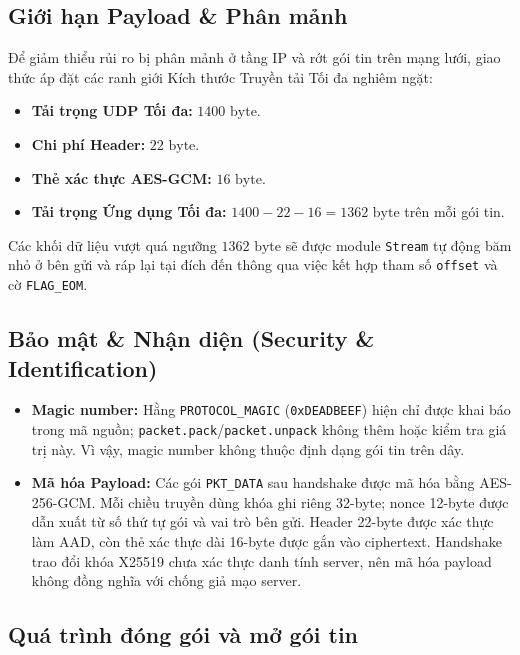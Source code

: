 \subsection{Giới hạn Payload \& Phân mảnh}
Để giảm thiểu rủi ro bị phân mảnh ở tầng IP và rớt gói tin trên mạng lưới, giao thức áp đặt các ranh giới Kích thước Truyền tải Tối đa nghiêm ngặt:

\begin{itemize}
    \item \textbf{Tải trọng UDP Tối đa:} $1400 \text{ byte}$.
    \item \textbf{Chi phí Header:} $22 \text{ byte}$.
    \item \textbf{Thẻ xác thực AES-GCM:} $16 \text{ byte}$.
    \item \textbf{Tải trọng Ứng dụng Tối đa:} $1400-22-16=1362 \text{ byte}$ trên mỗi gói tin.
\end{itemize}
Các khối dữ liệu vượt quá ngưỡng $1362 \text{ byte}$ sẽ được module \texttt{Stream} tự động băm nhỏ ở bên gửi và ráp lại tại đích đến thông qua việc kết hợp tham số \texttt{offset} và cờ \texttt{FLAG\_EOM}.

\subsection{Bảo mật \& Nhận diện (Security \& Identification)}
\begin{itemize}
    \item \textbf{Magic number:} Hằng \texttt{PROTOCOL\_MAGIC} (\texttt{0xDEADBEEF}) hiện chỉ được khai báo trong mã nguồn; \texttt{packet.pack}/\texttt{packet.unpack} không thêm hoặc kiểm tra giá trị này. Vì vậy, magic number không thuộc định dạng gói tin trên dây.
    \item \textbf{Mã hóa Payload:} Các gói \texttt{PKT\_DATA} sau handshake được mã hóa bằng AES-256-GCM. Mỗi chiều truyền dùng khóa ghi riêng 32-byte; nonce 12-byte được dẫn xuất từ số thứ tự gói và vai trò bên gửi. Header 22-byte được xác thực làm AAD, còn thẻ xác thực dài 16-byte được gắn vào ciphertext. Handshake trao đổi khóa X25519 chưa xác thực danh tính server, nên mã hóa payload không đồng nghĩa với chống giả mạo server.
\end{itemize}



\subsection{Quá trình đóng gói và mở gói tin}

